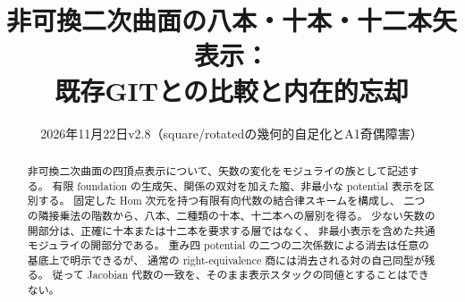 \documentclass[a4paper,11pt]{ltjsarticle}
\title{非可換二次曲面の八本・十本・十二本矢表示：\\
  既存GITとの比較と内在的忘却}
\author{}
\date{2026年11月22日\quad v2.8（square/rotatedの幾何的自足化とA1奇偶障害）}
\numberwithin{equation}{section}
\theoremstyle{plain}
\theoremstyle{definition}
\theoremstyle{remark}
\begin{document}
\maketitle
\begin{abstract}
非可換二次曲面の四頂点表示について、矢数の変化をモジュライの族として記述する。
有限 foundation の生成矢、関係の双対を加えた箙、非最小な potential 表示を区別する。
固定した Hom 次元を持つ有限有向代数の結合律スキームを構成し、
二つの隣接乗法の階数から、八本、二種類の十本、十二本への層別を得る。
少ない矢数の開部分は、正確に十本または十二本を要求する層ではなく、
非最小表示を含めた共通モジュライの開部分である。
重み四 potential の二つの二次係数による消去は任意の基底上で明示できるが、
通常の right-equivalence 商には消去される対の自己同型が残る。
従って Jacobian 代数の一致を、そのまま表示スタックの同値とすることはできない。


\end{abstract}
\end{document}
